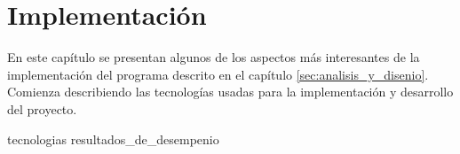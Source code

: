 %
%
%

\chapter{Implementación}
\label{sec:implementacion}

En este capítulo se presentan algunos de los aspectos más interesantes de
la implementación del programa descrito en el capítulo
\ref{sec:analisis_y_disenio}. Comienza describiendo las tecnologías
usadas para la implementación y desarrollo del proyecto.

{tecnologias}
{resultados_de_desempenio}

